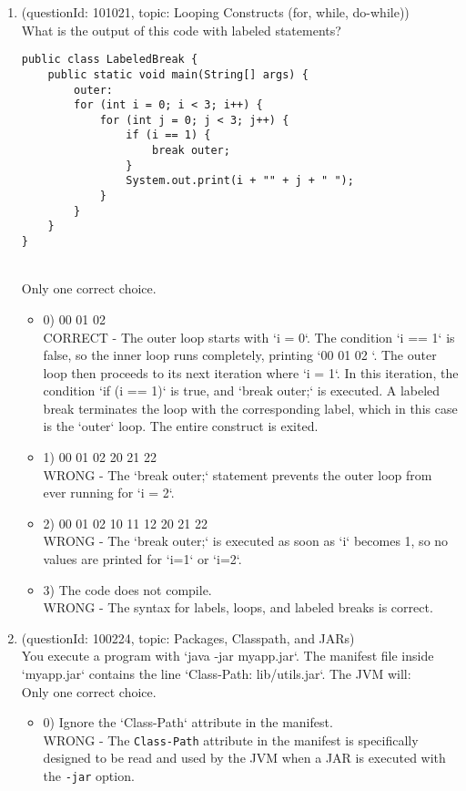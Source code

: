 \documentclass[12pt]{article}
\begin{document}
\begin{enumerate}[label=(\arabic*)]
\begin{itemize}
\end{itemize}
\item (questionId: 101021, topic: Looping Constructs (for, while, do-while)) \\ 
What is the output of this code with labeled statements?\n\begin{verbatim}
public class LabeledBreak {
    public static void main(String[] args) {
        outer:
        for (int i = 0; i < 3; i++) {
            for (int j = 0; j < 3; j++) {
                if (i == 1) {
                    break outer;
                }
                System.out.print(i + "" + j + " ");
            }
        }
    }
}
\end{verbatim}
\\ \noindent Only one correct choice. 
\begin{itemize}
\item 0) 00 01 02 
 \\ 
CORRECT - The outer loop starts with `i = 0`. The condition `i == 1` is false, so the inner loop runs completely, printing `00 01 02 `. The outer loop then proceeds to its next iteration where `i = 1`. In this iteration, the condition `if (i == 1)` is true, and `break outer;` is executed. A labeled break terminates the loop with the corresponding label, which in this case is the `outer` loop. The entire construct is exited.

\item 1) 00 01 02 20 21 22 
 \\ 
WRONG - The `break outer;` statement prevents the outer loop from ever running for `i = 2`.

\item 2) 00 01 02 10 11 12 20 21 22 
 \\ 
WRONG - The `break outer;` is executed as soon as `i` becomes 1, so no values are printed for `i=1` or `i=2`.

\item 3) The code does not compile.
 \\ 
WRONG - The syntax for labels, loops, and labeled breaks is correct.

\end{itemize}
\item (questionId: 100224, topic: Packages, Classpath, and JARs) \\ 
You execute a program with `java -jar myapp.jar`. The manifest file inside `myapp.jar` contains the line `Class-Path: lib/utils.jar`. The JVM will:
\\ \noindent Only one correct choice. 
\begin{itemize}
\item 0) Ignore the `Class-Path` attribute in the manifest.
 \\ 
WRONG - The \verb|Class-Path| attribute in the manifest is specifically designed to be read and used by the JVM when a JAR is executed with the \verb|-jar| option.


\end{itemize}
\end{enumerate}
\end{document}

